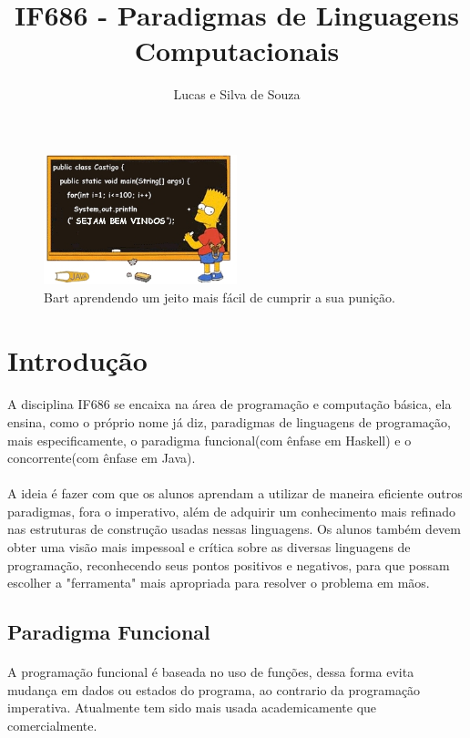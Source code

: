 \documentclass[a4paper]{article}
\title{IF686 - Paradigmas de Linguagens Computacionais}
\author{Lucas e Silva de Souza}
\begin{document}
\maketitle

\begin{figure}[ht]
\centering
\includegraphics[width=0.5\textwidth]{lss8.jpg}
\caption{\label{fig:download}Bart aprendendo um jeito mais fácil de cumprir a sua punição.}
\end{figure}

\section{Introdução}

\paragraph{} A disciplina IF686 se encaixa na área de programação e computação básica, ela ensina, como o próprio nome já diz, paradigmas de linguagens de programação, mais especificamente, o paradigma funcional(com ênfase em Haskell) e o concorrente(com ênfase em Java). 
\paragraph{} A ideia é fazer com que os alunos aprendam a utilizar de maneira eficiente outros paradigmas, fora o imperativo, além de adquirir um conhecimento mais refinado nas estruturas de construção usadas nessas linguagens. Os alunos também devem obter uma visão mais impessoal e crítica sobre as diversas linguagens de programação, reconhecendo seus pontos positivos e negativos, para que possam escolher a "ferramenta" mais apropriada para resolver o problema em mãos.  

\subsection{Paradigma Funcional}

\paragraph{} A programação funcional é baseada no uso de funções, dessa forma evita mudança em dados ou estados do programa, ao contrario da programação imperativa. Atualmente tem sido mais usada academicamente que comercialmente. 
\end{document}
